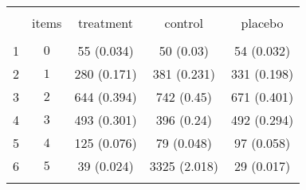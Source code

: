 
\begin{table}[!htbp] \centering 
  \caption{} 
  \label{} 
\begin{tabular}{@{\extracolsep{5pt}} ccccc} 
\\[-1.8ex]\hline 
\hline \\[-1.8ex] 
 & items & treatment & control & placebo \\ 
\hline \\[-1.8ex] 
1 & $0$ & 55 (0.034) & 50 (0.03) & 54 (0.032) \\ 
2 & $1$ & 280 (0.171) & 381 (0.231) & 331 (0.198) \\ 
3 & $2$ & 644 (0.394) & 742 (0.45) & 671 (0.401) \\ 
4 & $3$ & 493 (0.301) & 396 (0.24) & 492 (0.294) \\ 
5 & $4$ & 125 (0.076) & 79 (0.048) & 97 (0.058) \\ 
6 & $5$ & 39 (0.024) & 3325 (2.018) & 29 (0.017) \\ 
\hline \\[-1.8ex] 
\end{tabular} 
\end{table} 
